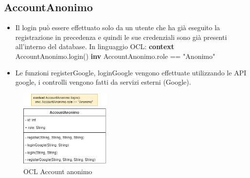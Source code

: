 \documentclass[a4paper,12pt]{article}
\begin{document}
\subsection{AccountAnonimo}
\begin{itemize}
    \item Il login può essere effettuato solo da un utente che ha già eseguito la registrazione in precedenza e quindi le sue credenziali sono già presenti all'interno del database. \newline \newline In linguaggio OCL:\newline
    \textbf{context} AccountAnonimo.login() \newline
    \textbf{inv} AccountAnonimo.role == "Anonimo"
    
    \item Le funzioni registerGoogle, loginGoogle vengono effettuate utilizzando le API google, i controlli vengono fatti da servizi esterni (Google).
\end{itemize}

\begin{figure}[H]
   \centering
   \includegraphics[width=0.4\textwidth] {D3/img/account_anonimo_OCL.png}
    \caption{OCL Account anonimo}
\end{figure}
\end{document}
